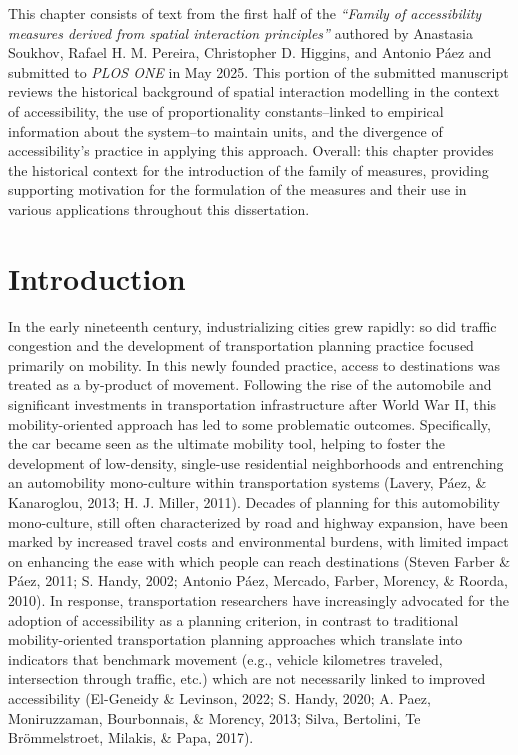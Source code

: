 \documentclass[
11pt, %
oneside, %
english, %
singlespacing, %
]{macthesis} %
\begin{document}
This chapter consists of text from the first half of the \emph{``Family of accessibility measures derived from spatial interaction principles''} authored by Anastasia Soukhov, Rafael H. M. Pereira, Christopher D. Higgins, and Antonio Páez and submitted to \emph{PLOS ONE} in May 2025. This portion of the submitted manuscript reviews the historical background of spatial interaction modelling in the context of accessibility, the use of proportionality constants--linked to empirical information about the system--to maintain units, and the divergence of accessibility's practice in applying this approach. Overall: this chapter provides the historical context for the introduction of the family of measures, providing supporting motivation for the formulation of the measures and their use in various applications throughout this dissertation.

\section{Introduction}\label{introduction-1}

In the early nineteenth century, industrializing cities grew rapidly: so did traffic congestion and the development of transportation planning practice focused primarily on mobility. In this newly founded practice, access to destinations was treated as a by-product of movement. Following the rise of the automobile and significant investments in transportation infrastructure after World War II, this mobility-oriented approach has led to some problematic outcomes. Specifically, the car became seen as the ultimate mobility tool, helping to foster the development of low-density, single-use residential neighborhoods and entrenching an automobility mono-culture within transportation systems (Lavery, Páez, \& Kanaroglou, 2013; H. J. Miller, 2011). Decades of planning for this automobility mono-culture, still often characterized by road and highway expansion, have been marked by increased travel costs and environmental burdens, with limited impact on enhancing the ease with which people can reach destinations (Steven Farber \& Páez, 2011; S. Handy, 2002; Antonio Páez, Mercado, Farber, Morency, \& Roorda, 2010). In response, transportation researchers have increasingly advocated for the adoption of accessibility as a planning criterion, in contrast to traditional mobility-oriented transportation planning approaches which translate into indicators that benchmark movement (e.g., vehicle kilometres traveled, intersection through traffic, etc.) which are not necessarily linked to improved accessibility (El-Geneidy \& Levinson, 2022; S. Handy, 2020; A. Paez, Moniruzzaman, Bourbonnais, \& Morency, 2013; Silva, Bertolini, Te Brömmelstroet, Milakis, \& Papa, 2017).
\end{document}
